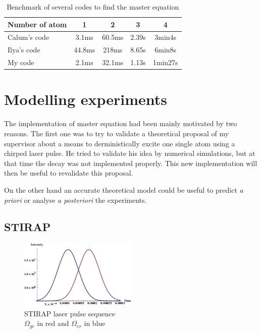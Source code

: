 \documentclass[twoside, open=right
]{scrreprt}
\newcommand{\Om}{\Omega}
\begin{document}
\begin{table}[h]
  \centering
  \begin{tabular}{||l||c c c c||}
    \hline
    Number of atom & 1 & 2 & 3 & 4\\
    \hline \hline
    Calum's code & 3.1ms & 60.5ms & 2.39s & 3min4s\\
    Ilya's code & 44.8ms & 218ms & 8.65s & 6min8s \\
    My code & 2.1ms & 32.1ms & 1.13s & 1min27s \\
    \hline
  \end{tabular}
  \caption{\label{benchmark}Benchmark of several codes to find the master equation}
\end{table}

\section{Modelling experiments}

\par The implementation of master equation had been mainly motivated by two reasons. The first one was to try to validate a theoretical proposal of my supervisor about a means to derministically excite one single atom using a chirped laser pulse. He tried to validate his idea by numerical simulations, but at that time the decay was not implemented properly. This new implementation will then be useful to revalidate this proposal.

\par On the other hand an accurate theoretical model could be useful to predict \emph{a priori} or analyse \emph{a posteriori} the experiments. 

\subsection{STIRAP}

\begin{figure}
  \vspace{-10pt}
  \centering
  \includegraphics[width=0.5\textwidth]{STIRAP-seq.pdf}
  \caption{\label{STIRAP-seq}STIRAP laser pulse sequence\\$\Om_{ge}$ in red and $\Om_{er}$ in blue}
  \vspace{-10pt}
\end{figure}
\end{document}
